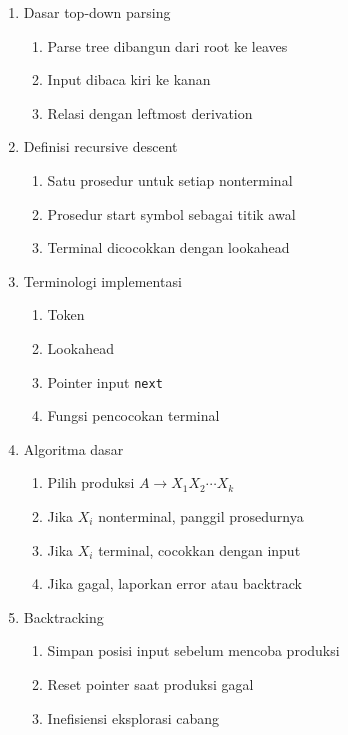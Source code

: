 \begin{enumerate}
    \item \pwajib Dasar top-down parsing
    \begin{enumerate}
        \item \pwajib Parse tree dibangun dari root ke leaves
        \item \pwajib Input dibaca kiri ke kanan
        \item \pwajib Relasi dengan leftmost derivation
    \end{enumerate}
    \item \pwajib Definisi recursive descent
    \begin{enumerate}
        \item \pwajib Satu prosedur untuk setiap nonterminal
        \item \pwajib Prosedur start symbol sebagai titik awal
        \item \pwajib Terminal dicocokkan dengan lookahead
    \end{enumerate}
    \item \pwajib Terminologi implementasi
    \begin{enumerate}
        \item \pwajib Token
        \item \pwajib Lookahead
        \item \pwajib Pointer input \texttt{next}
        \item \pwajib Fungsi pencocokan terminal
    \end{enumerate}
    \item \pwajib Algoritma dasar
    \begin{enumerate}
        \item \pwajib Pilih produksi $A\rightarrow X_1X_2\cdots X_k$
        \item \pwajib Jika $X_i$ nonterminal, panggil prosedurnya
        \item \pwajib Jika $X_i$ terminal, cocokkan dengan input
        \item \pwajib Jika gagal, laporkan error atau backtrack
    \end{enumerate}
    \item \pwajib Backtracking
    \begin{enumerate}
        \item \pwajib Simpan posisi input sebelum mencoba produksi
        \item \pwajib Reset pointer saat produksi gagal
        \item \ppaham Inefisiensi eksplorasi cabang

\end{enumerate}
\end{enumerate}
